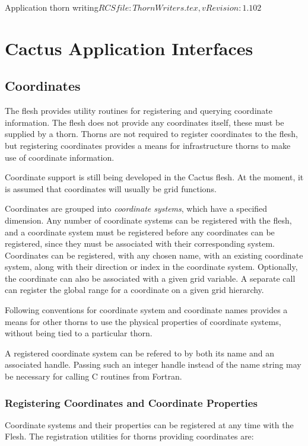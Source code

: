 \begin{cactuspart}{2}{Application thorn writing}{$RCSfile: ThornWriters.tex,v $}{$Revision: 1.102 $}
\chapter{Cactus Application Interfaces}


\section{Coordinates}
\label{sec:co}

The flesh provides utility routines for registering and querying
coordinate information. The flesh does not provide any coordinates
itself, these must be supplied by a thorn. Thorns are not required to
register coordinates to the flesh, but registering coordinates
provides a means for infrastructure thorns to make use of coordinate
information.

Coordinate support is still being developed in the Cactus flesh. At
the moment, it is assumed that coordinates will usually be grid
functions.

Coordinates are grouped into {\it coordinate systems}, which have a
specified dimension. Any number of coordinate systems can be
registered with the flesh, and a coordinate system must be registered
before any coordinates can be registered, since they must be
associated with their corresponding system.  Coordinates can be
registered, with any chosen name, with an existing coordinate system,
along with their direction or index in the coordinate system.
Optionally, the coordinate can also be associated with a given grid
variable.  A separate call can register the global range for a
coordinate on a given grid hierarchy.

Following conventions for coordinate system and coordinate names
provides a means for other thorns to use the physical properties of
coordinate systems, without being tied to a particular thorn.

A registered coordinate system can be refered to by both its name and
an associated handle. Passing such an integer handle instead of the
name string may be necessary for calling C routines from Fortran.

\subsection{Registering Coordinates and Coordinate Properties}

Coordinate systems and their properties can be registered at any time with the Flesh.
The registration utilities for thorns providing coordinates are:
\begin{Lentry}


\end{Lentry}
\end{cactuspart}
